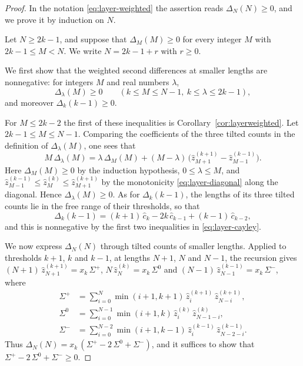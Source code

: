 \documentclass{amsart}
\theoremstyle{definition}
\theoremstyle{remark}
\numberwithin{equation}{section}
\begin{document}
\begin{proof}
In the notation \eqref{eq:layer-weighted} the assertion reads $\Delta_N(N)\ge 0$, and we prove it by induction on $N$.

Let $N\ge 2k-1$, and suppose that $\Delta_M(M)\ge 0$ for every integer $M$ with $2k-1\le M<N$. We write $N=2k-1+r$ with $r\ge 0$.

We first show that the weighted second differences at smaller lengths are nonnegative: for integers $M$ and real numbers $\lambda$,
\begin{equation}\label{eq:layer-smaller}
\Delta_\lambda(M)\ge 0\qquad(k\le M\le N-1,\ k\le\lambda\le 2k-1),
\end{equation}
and moreover $\Delta_k(k-1)\ge 0$.

For $M\le 2k-2$ the first of these inequalities is Corollary~\ref{cor:layerweighted}. Let $2k-1\le M\le N-1$. Comparing the coefficients of the three tilted counts in the definition of $\Delta_\lambda(M)$, one sees that
\[
M\,\Delta_\lambda(M)=\lambda\,\Delta_M(M)+(M-\lambda)\,\bigl(\hat z^{(k+1)}_{M+1}-\hat z^{(k-1)}_{M-1}\bigr).
\]
Here $\Delta_M(M)\ge 0$ by the induction hypothesis, $0\le\lambda\le M$, and $\hat z^{(k-1)}_{M-1}\le\hat z^{(k)}_M\le\hat z^{(k+1)}_{M+1}$ by the monotonicity \eqref{eq:layer-diagonal} along the diagonal. Hence $\Delta_\lambda(M)\ge 0$. As for $\Delta_k(k-1)$, the lengths of its three tilted counts lie in the free range of their thresholds, so that
\[
\Delta_k(k-1)=(k+1)\,\hat c_k-2k\,\hat c_{k-1}+(k-1)\,\hat c_{k-2},
\]
and this is nonnegative by the first two inequalities in \eqref{eq:layer-cayley}.

We now express $\Delta_N(N)$ through tilted counts of smaller lengths. Applied to thresholds $k+1$, $k$ and $k-1$, at lengths $N+1$, $N$ and $N-1$, the recursion gives $(N+1)\,\hat z^{(k+1)}_{N+1}=x_k\,\Sigma^{+}$, $N\,\hat z^{(k)}_N=x_k\,\Sigma^{0}$ and $(N-1)\,\hat z^{(k-1)}_{N-1}=x_k\,\Sigma^{-}$, where
\begin{align*}
\Sigma^{+}&=\sum_{i=0}^{N}\min(i+1,k+1)\,\hat z^{(k+1)}_i\,\hat z^{(k+1)}_{N-i},\\
\Sigma^{0}&=\sum_{i=0}^{N-1}\min(i+1,k)\,\hat z^{(k)}_i\,\hat z^{(k)}_{N-1-i},\\
\Sigma^{-}&=\sum_{i=0}^{N-2}\min(i+1,k-1)\,\hat z^{(k-1)}_i\,\hat z^{(k-1)}_{N-2-i}.
\end{align*}
Thus $\Delta_N(N)=x_k\,(\Sigma^{+}-2\,\Sigma^{0}+\Sigma^{-})$, and it suffices to show that $\Sigma^{+}-2\,\Sigma^{0}+\Sigma^{-}\ge 0$.


\end{proof}
\end{document}

